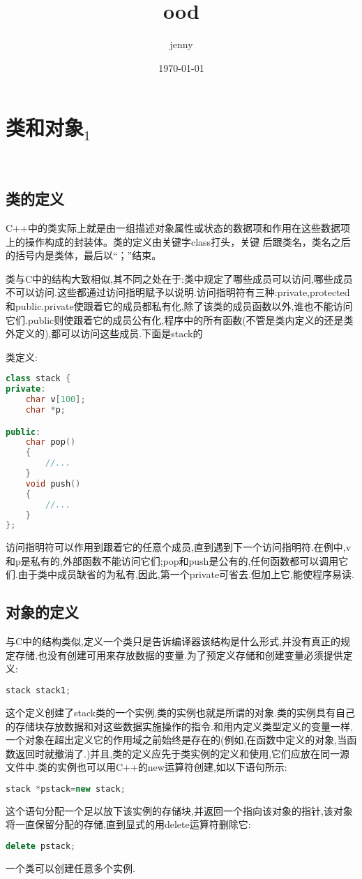 \documentclass{article}
\author{jenny}
\date{\today}
\title{ood}
\begin{document}
\maketitle
\tableofcontents


\section{类和对象$_{\text{1}}$}
\label{sec-1}
　　
\subsection{类的定义}
\label{sec-1-1}

C++中的类实际上就是由一组描述对象属性或状态的数据项和作用在这些数据项上的操作构成的封装体。类的定义由关键字class打头，关键 后跟类名，类名之后的括号内是类体，最后以“；”结束。

类与C中的结构大致相似,其不同之处在于:类中规定了哪些成员可以访问,哪些成员不可以访问.这些都通过访问指明赋予以说明.访问指明符有三种:private,protected和public.private使跟着它的成员都私有化,除了该类的成员函数以外,谁也不能访问它们.public则使跟着它的成员公有化,程序中的所有函数(不管是类内定义的还是类外定义的),都可以访问这些成员.下面是stack的

类定义:
\begin{lstlisting}[language=c++]
class stack {
private:
    char v[100];
    char *p;

public:
    char pop() 
    {
        //...
    }
    void push()
    {
        //...
    }
};
\end{lstlisting}
访问指明符可以作用到跟着它的任意个成员,直到遇到下一个访问指明符.在例中,v和p是私有的,外部函数不能访问它们;pop和push是公有的,任何函数都可以调用它们.由于类中成员缺省的为私有,因此,第一个private可省去.但加上它,能使程序易读.
\subsection{对象的定义}
\label{sec-1-2}
与C中的结构类似,定义一个类只是告诉编译器该结构是什么形式,并没有真正的规定存储,也没有创建可用来存放数据的变量.为了预定义存储和创建变量必须提供定义:
\begin{lstlisting}[language=c++]
     stack stack1;
\end{lstlisting}
这个定义创建了stack类的一个实例,类的实例也就是所谓的对象.类的实例具有自己的存储块存放数据和对这些数据实施操作的指令.和用内定义类型定义的变量一样,一个对象在超出定义它的作用域之前始终是存在的(例如,在函数中定义的对象,当函数返回时就撤消了.)并且,类的定义应先于类实例的定义和使用,它们应放在同一源文件中.类的实例也可以用C++的new运算符创建,如以下语句所示:
\begin{lstlisting}[language=c++]
       stack *pstack=new stack;
\end{lstlisting}
这个语句分配一个足以放下该实例的存储块,并返回一个指向该对象的指针,该对象将一直保留分配的存储,直到显式的用delete运算符删除它:
\begin{lstlisting}[language=c++]
       delete pstack;
\end{lstlisting}
一个类可以创建任意多个实例.
\end{document}
